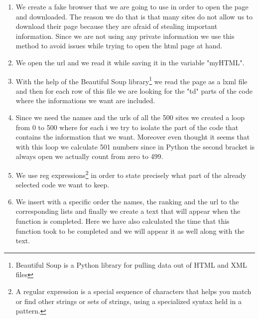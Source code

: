 \documentclass{article}
\begin{document}
\begin{enumerate}
\item We create a fake browser that we are going to use in order to open the page and downloaded. The reason we do that is that many sites do not allow us to download their page because they are afraid of stealing important information. Since we are not using any private information we use this method to avoid issues while trying to open the html page at hand. 
\item We open the url and we read it while saving it in the variable "myHTML".
\item With the help of the Beautiful Soup library\footnote{Beautiful Soup is a Python library for pulling data out of HTML and XML files} we read the page as a lxml file and then for each row of this file we are looking for the "td" parts of the code where the informations we want are included.
\item Since we need the names and the urls of all the 500 sites we created a loop from 0 to 500 where for each i we try to isolate the part of the code that contains the information that we want. Moreover even thought it seems that with this loop we calculate 501 numbers since in Python the second bracket is always open we actually count from zero to 499.
\item We use reg expressions\footnote{A regular expression is a special sequence of characters that helps you match or find other strings or sets of strings, using a specialized syntax held in a pattern.} in order to state precisely what part of the already selected code we want to keep.
\item We insert with a specific order the names, the ranking and the url to the corresponding lists and finally we create a text that will appear when the function is completed. Here we have also calculated the time that this function took to be completed and we will appear it as well along with the text.
\end{enumerate}
\end{document}
